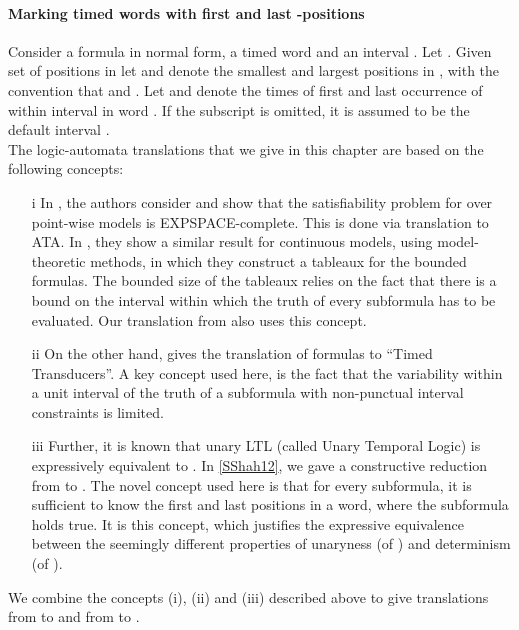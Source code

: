 \documentclass{llncs}
\newcommand{\POTDFA}{\mbox{}}
\newcommand{\bmitlfp}{\mbox{}}
\newcommand{\potdta}{\mbox{}}
\newcommand{\potdfa}{\POTDFA}
\newcommand{\utl}{\mbox{}}
\newcommand{\mitlfpinf}{\mbox{}}
\newcommand{\mitlfpb}{\bmitlfp}
\newcommand{\mitl}{\mbox{}}
\begin{document}
\paragraph{Marking timed words with first and last -positions\\}
Consider a formula  in normal form, a timed word  and an interval . Let  . Given set  of positions in  let  and  denote the smallest and largest positions in , with the convention that
 and . Let  and    denote 
the times of first and last occurrence of  within interval  in word .
If the subscript  is omitted, it is assumed to be the default interval .\\

The logic-automata translations that we give in this chapter are based on the following concepts:
\begin{itemize}
\item[i] In \cite{BMOW07}, the authors consider  and show that the satisfiability problem for  over point-wise models is EXPSPACE-complete. This is done via translation to ATA. In \cite{BMOW08}, they show a similar result for continuous models, using model-theoretic methods, in which they construct a tableaux for the bounded formulas. The bounded size of the tableaux relies on the fact that there is a bound on the interval within which the truth of every subformula has to be evaluated. Our translation from \mitlfpb\/ also uses this concept.
\item[ii] On the other hand, \cite{MNP06} gives the translation of \mitl\/ formulas to ``Timed Transducers''. A key concept used here, is the fact that the variability within a unit interval of the truth of a subformula with non-punctual interval constraints is limited. 
\item[iii] Further, it is known that unary LTL (called Unary Temporal Logic) is expressively equivalent to \potdfa. In \ref{SShah12}, we gave a constructive reduction from \utl\/ to \potdfa. The novel concept used here is that for every \utl\/ subformula, it is sufficient to know the first and last positions in a word, where the subformula holds true. It is this concept, which justifies the expressive equivalence between the seemingly different properties of unaryness (of \utl) and determinism (of \potdfa). 
\end{itemize}
We combine the concepts (i), (ii) and (iii) described above to give translations from \mitlfpinf\/ to \potdta\/ and from \mitlfpb\/ to \potdta\/.
\end{document}
